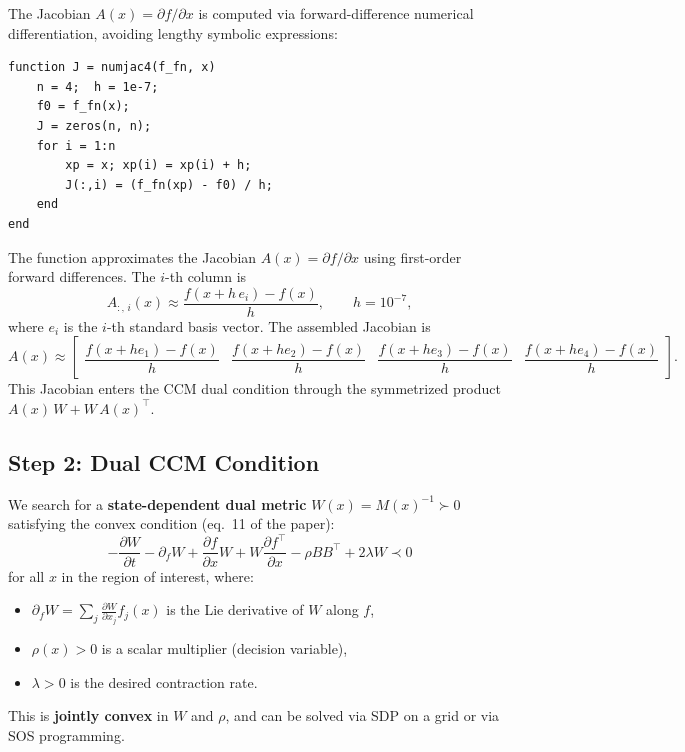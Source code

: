 \documentclass[11pt,a4paper]{article}
\begin{document}
The Jacobian \(A(x) = \partial f/\partial x\) is computed via forward-difference numerical differentiation, avoiding lengthy symbolic expressions:

\begin{lstlisting}
function J = numjac4(f_fn, x)
    n = 4;  h = 1e-7;
    f0 = f_fn(x);
    J = zeros(n, n);
    for i = 1:n
        xp = x; xp(i) = xp(i) + h;
        J(:,i) = (f_fn(xp) - f0) / h;
    end
end
\end{lstlisting}

\begin{codemath}
The function approximates the Jacobian \(A(x) = \partial f/\partial x\) using first-order forward differences. The \(i\)-th column is
\[
A_{:,\,i}(x) \approx \frac{f(x + h\, e_i) - f(x)}{h},
\qquad h = 10^{-7},
\]
where \(e_i\) is the \(i\)-th standard basis vector. The assembled Jacobian is
\[
A(x) \approx
\begin{bmatrix}
\dfrac{f(x+h e_1)-f(x)}{h} &
\dfrac{f(x+h e_2)-f(x)}{h} &
\dfrac{f(x+h e_3)-f(x)}{h} &
\dfrac{f(x+h e_4)-f(x)}{h}
\end{bmatrix}.
\]
This Jacobian enters the CCM dual condition through the symmetrized product \(A(x)\,W + W\,A(x)^\top\).
\end{codemath}

\subsection{Step 2: Dual CCM Condition}

We search for a \textbf{state-dependent dual metric} \(W(x) = M(x)^{-1} \succ 0\) satisfying the convex condition (eq.~11 of the paper):
\begin{equation}
-\frac{\partial W}{\partial t} - \partial_f W + \frac{\partial f}{\partial x}W + W\frac{\partial f^\top}{\partial x} - \rho B B^\top + 2\lambda W \prec 0
\label{eq:ccm_dual}
\end{equation}
for all \(x\) in the region of interest, where:
\begin{itemize}[leftmargin=2em]
    \item \(\partial_f W = \sum_j \frac{\partial W}{\partial x_j} f_j(x)\) is the Lie derivative of \(W\) along \(f\),
    \item \(\rho(x) > 0\) is a scalar multiplier (decision variable),
    \item \(\lambda > 0\) is the desired contraction rate.
\end{itemize}

This is \textbf{jointly convex} in \(W\) and \(\rho\), and can be solved via SDP on a grid or via SOS programming.
\end{document}
